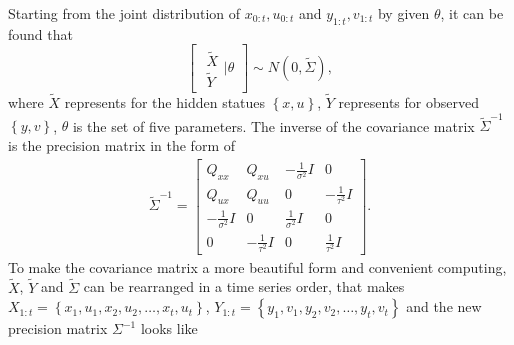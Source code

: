 Starting from the joint distribution of $x_{0:t},u_{0:t}$ and $y_{1:t},v_{1:t}$ by given $\theta$, it can be found that
\begin{equation}\label{jointmatrix}
\begin{bmatrix} \begin{matrix} \tilde{X}\\ \tilde{Y}  \end{matrix} \biggr\rvert \theta \end{bmatrix}
\sim N\left(0, \tilde{\Sigma} \right),
\end{equation}
where $\tilde{X}$ represents for the hidden statues $\left\lbrace x,u\right\rbrace$, $\tilde{Y}$ represents for observed $\left\lbrace y,v\right\rbrace$, $\theta$ is the set of five parameters.  The inverse of the covariance matrix $\tilde{\Sigma}^{-1}$ is the precision matrix in the form of
\begin{align} \tilde{\Sigma}^{-1}=
\begin{bmatrix}
Q_{xx} & Q_{xu} & -\frac{1}{\sigma^2}I & 0\\
Q_{ux} & Q_{uu} & 0 &-\frac{1}{\tau^2}I \\
-\frac{1}{\sigma^2}I & 0 & \frac{1}{\sigma^2}I  & 0\\
 0  &  -\frac{1}{\tau^2}I  & 0 & \frac{1}{\tau^2}I 
\end{bmatrix}.
\end{align}
To make the covariance matrix a more beautiful form and convenient computing, $\tilde{X}$, $\tilde{Y}$ and $\tilde{\Sigma}$ can be rearranged in a time series order, that makes $X_{1:t} = \left\lbrace x_1,u_1,x_2,u_2,\ldots, x_t, u_t \right\rbrace$, $Y_{1:t} = \left\lbrace y_1,v_1,y_2,v_2,\ldots, y_t, v_t \right\rbrace$ and the new precision matrix $\Sigma^{-1}$ looks like 
